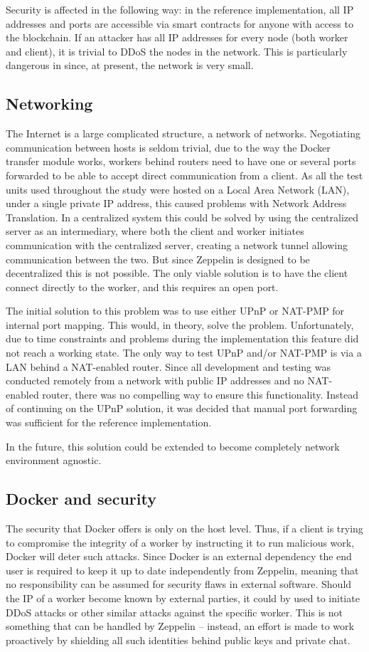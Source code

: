 Security is affected in the following way: in the reference implementation, all IP addresses and ports are accessible via smart contracts for anyone with access to the blockchain. If an attacker has all IP addresses for every node (both worker and client), it is trivial to DDoS the nodes in the network. This is particularly dangerous in since, at present, the network is very small. 

\subsection{Networking}
The Internet is a large complicated structure, a network of networks. Negotiating communication between hosts is seldom trivial, due to the way the Docker transfer module works, workers behind routers need to have one or several ports forwarded to be able to accept direct communication from a client. As all the test units used throughout the study were hosted on a Local Area Network (LAN), under a single private IP address, this caused problems with Network Address Translation. In a centralized system this could be solved by using the centralized server as an intermediary, where both the client and worker initiates communication with the centralized server, creating a network tunnel allowing communication between the two. But since Zeppelin is designed to be decentralized this is not possible. The only viable solution is to have the client connect directly to the worker, and this requires an open port.

The initial solution to this problem was to use either UPnP or NAT-PMP for internal port mapping. This would, in theory, solve the problem. Unfortunately, due to time constraints and problems during the implementation this feature did not reach a working state. The only way to test UPnP and/or NAT-PMP is via a LAN behind a NAT-enabled router. Since all development and testing was conducted remotely from a network with public IP addresses and no NAT-enabled router, there was no compelling way to ensure this functionality. Instead of continuing on the UPnP solution, it was decided that manual port forwarding was sufficient for the reference implementation.

In the future, this solution could be extended to become completely network environment agnostic.

\subsection{Docker and security}
The security that Docker offers is only on the host level. Thus, if a client is trying to compromise the integrity of a worker by instructing it to run malicious work, Docker will deter such attacks. Since Docker is an external dependency the end user is required to keep it up to date independently from Zeppelin, meaning that no responsibility can be assumed for security flaws in external software. Should the IP of a worker become known by external parties, it could by used to initiate DDoS attacks or other similar attacks against the specific worker. This is not something that can be handled by Zeppelin -- instead, an effort is made to work proactively by shielding all such identities behind public keys and private chat.

